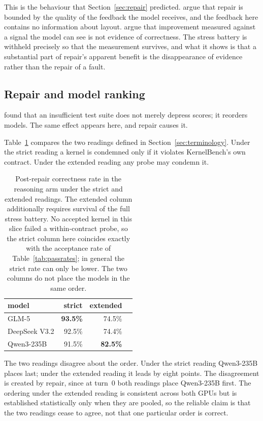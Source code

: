 \documentclass[12pt]{article}
\begin{document}
This is the behaviour that Section~\ref{sec:repair} predicted.
\citet{olausson2024selfrepair} argue that repair is bounded by the quality of
the feedback the model receives, and the feedback here contains no information
about layout. \citet{huang2024cannot} argue that improvement measured against a
signal the model can see is not evidence of correctness. The stress battery is
withheld precisely so that the measurement survives, and what it shows is that
a substantial part of repair's apparent benefit is the disappearance of
evidence rather than the repair of a fault.

\subsection{Repair and model ranking}
\label{sec:ranking}

\citet{liu2023evalplus} found that an insufficient test suite does not merely
depress scores; it reorders models. The same effect appears here, and repair
causes it.

Table~\ref{tab:ranking} compares the two readings defined in
Section~\ref{sec:terminology}. Under the strict reading a kernel is condemned
only if it violates KernelBench's own contract. Under the extended reading any
probe may condemn it.

\begin{table}[h]
\centering
\begin{tabular}{lrrl}
\toprule
model & strict & extended & \\
\midrule
GLM-5         & \textbf{93.5\%} & 74.5\% & \\
DeepSeek V3.2 & 92.5\% & 74.4\% & \\
Qwen3-235B    & 91.5\% & \textbf{82.5\%} & \\
\bottomrule
\end{tabular}
\caption{Post-repair correctness rate in the reasoning arm under the strict and
extended readings. The extended column additionally requires survival of the
full stress battery. No accepted kernel in this slice failed a within-contract
probe, so the strict column here coincides exactly with the acceptance rate of
Table~\ref{tab:passrates}; in general the strict rate can only be lower. The
two columns do not place the models in the same order.}
\label{tab:ranking}
\end{table}

The two readings disagree about the order. Under the strict reading
Qwen3-235B places last; under the extended reading it leads by eight points.
The disagreement is created by repair, since at turn~0 both readings place
Qwen3-235B first. The ordering under the extended reading is consistent across
both GPUs but is established statistically only when they are pooled, so the
reliable claim is that the two readings cease to agree, not that one particular
order is correct.
\end{document}
